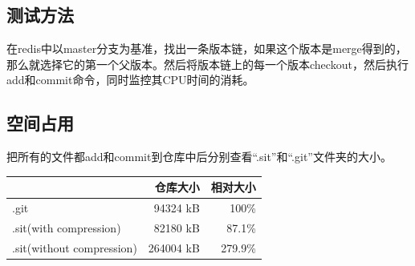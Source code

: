\documentclass[11pt, a4paper, UTF8]{ctexart}
\begin{document}
\subsection{测试方法}
在redis中以master分支为基准，找出一条版本链，如果这个版本是merge得到的，那么就选择它的第一个父版本。然后将版本链上的每一个版本checkout，然后执行add和commit命令，同时监控其CPU时间的消耗。
\subsection{空间占用}
把所有的文件都add和commit到仓库中后分别查看``.sit''和``.git''文件夹的大小。
\begin{center}
\begin{tabular}{|l|r|r|}
\hline
                         & 仓库大小 & 相对大小\\
\hline
.git                     & 94324 kB           &   100\% \\
\hline
.sit(with compression)   & 82180 kB           &  87.1\% \\
\hline
.sit(without compression)& 264004 kB          & 279.9\% \\
\hline
\end{tabular}
\end{center}
\end{document}
